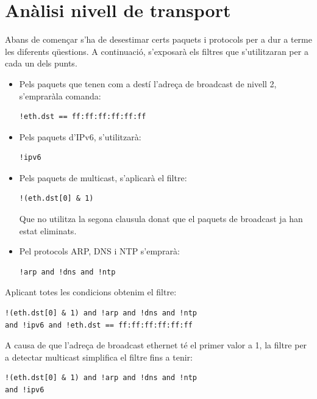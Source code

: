 \documentclass{article}
\begin{document}
\section{Anàlisi nivell de transport}
Abans de començar s'ha de desestimar certs paquets i protocols per a dur
a terme les diferents qüestions. A continuació, s'exposarà 
els filtres que s'utilitzaran per a cada un dels punts.\\
\begin{itemize}
\item Pels paquets que tenen com a destí l'adreça de broadcast de nivell 2,
s'empraràla comanda:
\begin{verbatim}
!eth.dst == ff:ff:ff:ff:ff:ff
\end{verbatim}
\item Pels paquets d'IPv6, s'utilitzarà:
\begin{verbatim}
!ipv6
\end{verbatim}
\item Pels paquets de multicast, s'aplicarà el filtre:
\begin{verbatim}
!(eth.dst[0] & 1)
\end{verbatim}
Que no utilitza la segona clausula donat que el paquets de broadcast
ja han estat eliminats.
\item Pel protocols ARP, DNS i NTP s'emprarà:
\begin{verbatim}
!arp and !dns and !ntp
\end{verbatim}
\end{itemize}
Aplicant totes les condicions obtenim el filtre:
\begin{verbatim}
!(eth.dst[0] & 1) and !arp and !dns and !ntp 
and !ipv6 and !eth.dst == ff:ff:ff:ff:ff:ff
\end{verbatim}
A causa de que l'adreça de broadcast ethernet té el primer valor a 1,
la filtre per a detectar multicast simplifica el filtre fins a tenir:
\begin{verbatim}
!(eth.dst[0] & 1) and !arp and !dns and !ntp 
and !ipv6
\end{verbatim}
\end{document}
